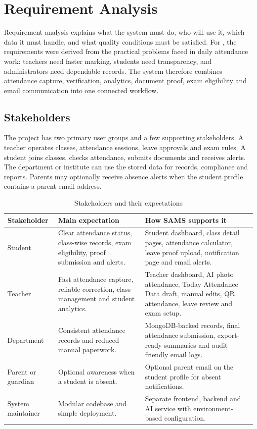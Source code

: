 \chapter{Requirement Analysis}
\label{chap:requirements}

Requirement analysis explains what the system must do, who will use it, which data it must handle, and what quality conditions must be satisfied. For \productname{}, the requirements were derived from the practical problems faced in daily attendance work: teachers need faster marking, students need transparency, and administrators need dependable records. The system therefore combines attendance capture, verification, analytics, document proof, exam eligibility and email communication into one connected workflow.

\section{Stakeholders}

The project has two primary user groups and a few supporting stakeholders. A teacher operates classes, attendance sessions, leave approvals and exam rules. A student joins classes, checks attendance, submits documents and receives alerts. The department or institute can use the stored data for records, compliance and reports. Parents may optionally receive absence alerts when the student profile contains a parent email address.

\begin{table}[H]
\centering
\caption{Stakeholders and their expectations}
\label{tab:stakeholders}
\begin{tabularx}{\textwidth}{p{3cm} X X}
\toprule
\textbf{Stakeholder} & \textbf{Main expectation} & \textbf{How SAMS supports it}\\
\midrule
Student & Clear attendance status, class-wise records, exam eligibility, proof submission and alerts. & Student dashboard, class detail pages, attendance calculator, leave proof upload, notification page and email alerts.\\
Teacher & Fast attendance capture, reliable correction, class management and student analytics. & Teacher dashboard, AI photo attendance, Today Attendance Data draft, manual edits, QR attendance, leave review and exam setup.\\
Department & Consistent attendance records and reduced manual paperwork. & MongoDB-backed records, final attendance submission, export-ready summaries and audit-friendly email logs.\\
Parent or guardian & Optional awareness when a student is absent. & Optional parent email on the student profile for absent notifications.\\
System maintainer & Modular codebase and simple deployment. & Separate frontend, backend and AI service with environment-based configuration.\\
\bottomrule
\end{tabularx}
\end{table}

